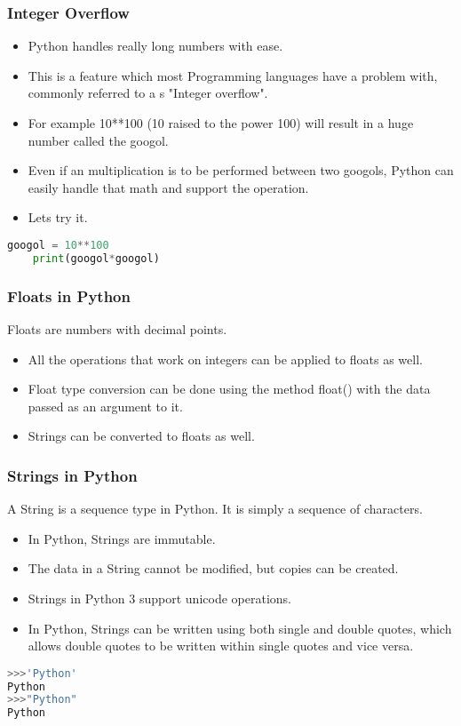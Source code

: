 \documentclass{beamer}
\begin{document}
\begin{frame}[fragile]
\frametitle{Integer Overflow}
\begin{itemize}
\item Python handles really long numbers with ease.
\item This is a feature which most Programming languages have a problem with, commonly referred to a s "Integer overflow".
\item For example 10**100 (10 raised to the power 100) will result in a huge number called the googol.
\item Even if an multiplication is to be performed between two googols, Python can easily handle that math and support the operation.
\item Lets try it.
\end{itemize}
\begin{lstlisting}[language=Python]
	googol = 10**100
	print(googol*googol)
\end{lstlisting}
\end{frame}

\begin{frame}
\frametitle{Floats in Python}
Floats are numbers with decimal points. 
\begin{itemize}
\item All the operations that work on integers can be applied to floats as well.
\item Float type conversion can be done using the method float() with the data passed as an argument to it.
\item Strings can be converted to floats as well.

\end{itemize}
\end{frame}

\begin{frame}[fragile]
\frametitle{Strings in Python}
A String is a sequence type in Python. It is simply a sequence of characters.
\begin{itemize}
\item In Python, Strings are immutable.
\item The data in a String cannot be modified, but copies can be created.
\item Strings in Python 3 support unicode operations.
\item In Python, Strings can be written using both single and double quotes, which allows  double quotes to be written within single quotes and vice versa.

\end{itemize}
\begin{lstlisting}[language=Python]
>>>'Python'
Python
>>>"Python"
Python
\end{lstlisting}
\end{frame}
\end{document}
